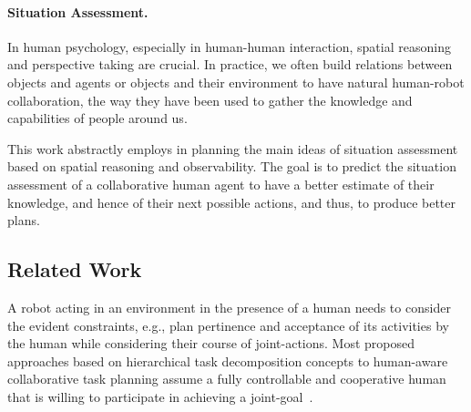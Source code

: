 \documentclass[letterpaper]{article} %
\begin{document}
\paragraph{Situation Assessment.} In human psychology, especially in human-human interaction, spatial reasoning and perspective taking are crucial. 
In practice, we often build relations between objects and agents or objects and their environment to have natural human-robot collaboration, the way they have been used to gather the knowledge and capabilities of people around us. 



This work abstractly employs in planning the main ideas of situation assessment based on spatial reasoning and observability. The goal is to predict the situation assessment of a collaborative human agent 
to have a better estimate 
of their knowledge, and hence of their next possible actions, and thus, to produce better plans.

\subsection{Related Work}
A robot acting in an environment in the presence of a human needs to consider the evident constraints, e.g., plan pertinence and acceptance of its activities by the human while considering their course of joint-actions.
Most proposed approaches based on hierarchical task decomposition concepts to human-aware collaborative task planning assume a fully controllable and cooperative human that is willing to participate in achieving a joint-goal~\cite{sebastiani2017dealing,alami2006toward,lallement2014hatp,lallement2018hatp}.
\end{document}
